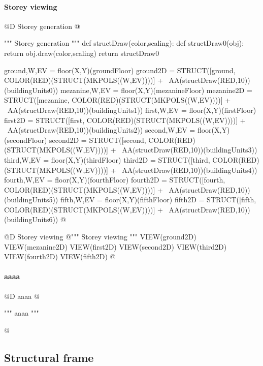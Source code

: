 \documentclass[11pt,oneside]{article}    %
\begin{document}
\paragraph{Storey viewing}
@D Storey generation
@{""" Storey generation """
def structDraw(color,scaling):
    def structDraw0(obj): return obj.draw(color,scaling)
    return structDraw0

ground,W,EV = floor(X,Y)(groundFloor)
ground2D = STRUCT([ground, COLOR(RED)(STRUCT(MKPOLS((W,EV))))] + \
            AA(structDraw(RED,10))(buildingUnits0))
mezanine,W,EV = floor(X,Y)(mezanineFloor)
mezanine2D = STRUCT([mezanine, COLOR(RED)(STRUCT(MKPOLS((W,EV))))] + \
            AA(structDraw(RED,10))(buildingUnits1))
first,W,EV = floor(X,Y)(firstFloor)
first2D = STRUCT([first, COLOR(RED)(STRUCT(MKPOLS((W,EV))))] + \
            AA(structDraw(RED,10))(buildingUnits2))
second,W,EV = floor(X,Y)(secondFloor)
second2D = STRUCT([second, COLOR(RED)(STRUCT(MKPOLS((W,EV))))] + \
            AA(structDraw(RED,10))(buildingUnits3))
third,W,EV = floor(X,Y)(thirdFloor)
third2D = STRUCT([third, COLOR(RED)(STRUCT(MKPOLS((W,EV))))] + \
            AA(structDraw(RED,10))(buildingUnits4))
fourth,W,EV = floor(X,Y)(fourthFloor)
fourth2D = STRUCT([fourth, COLOR(RED)(STRUCT(MKPOLS((W,EV))))] + \
            AA(structDraw(RED,10))(buildingUnits5))
fifth,W,EV = floor(X,Y)(fifthFloor)
fifth2D = STRUCT([fifth, COLOR(RED)(STRUCT(MKPOLS((W,EV))))] + \
            AA(structDraw(RED,10))(buildingUnits6))
@}

@D Storey viewing
@{""" Storey viewing """
VIEW(ground2D)
VIEW(mezanine2D)
VIEW(first2D)
VIEW(second2D)
VIEW(third2D)
VIEW(fourth2D)
VIEW(fifth2D)
@}


\paragraph{aaaa}
@D aaaa
@{""" aaaa """

@}

\subsection{Structural frame}
\end{document}
